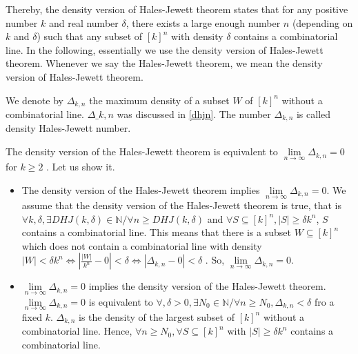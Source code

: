 Thereby, the density version of Hales-Jewett theorem states that for any positive number $k$ and real number $\delta$,  there exists a large enough number $n$ (depending on $k$ and $\delta$) such that  any subset of  $[k]^n $ with density $\delta$ contains a combinatorial line.
In the following, essentially  we use  the density version of  Hales-Jewett theorem. Whenever we say the Hales-Jewett theorem, we mean the density version of Hales-Jewett theorem.

We denote by $\Delta_{k,n}$ the maximum density of a subset $W$ of $[k]^n$ without a combinatorial line. $\Delta\_{k,n}$ was discussed in  \eqref{dhjn}.
The number $\Delta_{k,n}$ is called density Hales-Jewett number.

The density version of the Hales-Jewett theorem is equivalent to  $\lim\limits_{n\longrightarrow \infty} \Delta_{k,n}=0$ for $k\geq 2$ \citep{furstenberg1991density}. Let us show it. \begin{itemize}
\item The density version of the Hales-Jewett theorem implies   $\lim\limits_{n\longrightarrow \infty} \Delta_{k,n}=0$. We assume that the density version of the Hales-Jewett theorem is true, that is $\forall k, \delta, \exists DHJ(k,\delta)  \in \mathbb{N} / \forall n\geq DHJ(k,\delta)$ and $\forall S \subseteq [k]^n, |S| \geq \delta k^n$, $S$ contains a combinatorial line. This means that  there is a subset $W \subseteq [k]^n$ which does not contain a combinatorial line with density $|W| < \delta k^n \Longleftrightarrow |\frac{|W|}{k^n}-0| <\delta \Longleftrightarrow |\Delta_{k,n}-0|<\delta $ . So, $\lim\limits_{n\longrightarrow \infty} \Delta_{k,n}=0$.
\item $\lim\limits_{n\longrightarrow \infty} \Delta_{k,n}=0$ implies the density version of the Hales-Jewett theorem. $\lim\limits_{n\longrightarrow \infty} \Delta_{k,n}=0$ is equivalent to $\forall , \delta >0, \exists N_0 \in \mathbb{N} /\forall n \geq N_0, \Delta_{k,n} < \delta$  fro a fixed $k.$ $ \Delta_{k,n}$ is the density of the largest subset of $[k]^n$ without a combinatorial line. Hence, $\forall n \geq N_0, \forall S \subseteq [k]^n$ with $|S| \geq \delta k^n$ contains a combinatorial line.
\end{itemize} 


